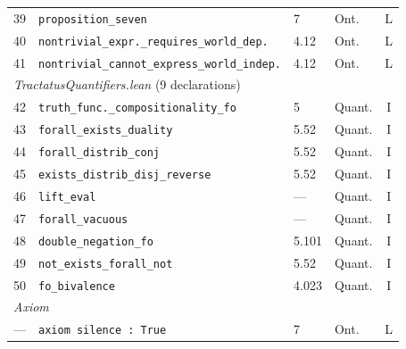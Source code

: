\documentclass[10pt, letterpaper]{article}
\theoremstyle{definition}
\theoremstyle{remark}
\begin{document}
\begin{table}[p]
\begin{tabular}{@{}rlllc@{}}
39 & \texttt{proposition\_seven}                         & 7       & Ont. & L \\
40 & \texttt{nontrivial\_expr.\_requires\_world\_dep.}   & 4.12    & Ont. & L \\
41 & \texttt{nontrivial\_cannot\_express\_world\_indep.} & 4.12    & Ont. & L \\
\midrule
\multicolumn{5}{l}{\emph{TractatusQuantifiers.lean} (9 declarations)} \\
\midrule
42 & \texttt{truth\_func.\_compositionality\_fo}         & 5       & Quant. & I \\
43 & \texttt{forall\_exists\_duality}                    & 5.52    & Quant. & I \\
44 & \texttt{forall\_distrib\_conj}                      & 5.52    & Quant. & I \\
45 & \texttt{exists\_distrib\_disj\_reverse}             & 5.52    & Quant. & I \\
46 & \texttt{lift\_eval}                                 & ---     & Quant. & I \\
47 & \texttt{forall\_vacuous}                            & ---     & Quant. & I \\
48 & \texttt{double\_negation\_fo}                       & 5.101   & Quant. & I \\
49 & \texttt{not\_exists\_forall\_not}                   & 5.52    & Quant. & I \\
50 & \texttt{fo\_bivalence}                              & 4.023   & Quant. & I \\
\midrule
\multicolumn{5}{l}{\emph{Axiom}} \\
\midrule
--- & \texttt{axiom silence : True}                      & 7       & Ont. & L \\
\bottomrule
\end{tabular}
\end{table}

\end{document}
